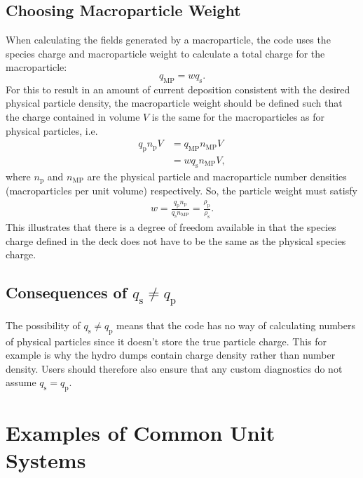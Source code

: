 \documentclass[twocolumn,10pt]{article}
\begin{document}
\subsection{Choosing Macroparticle Weight}
When calculating the fields generated by a macroparticle, the code uses the species charge and macroparticle weight to calculate a total charge for the macroparticle:
\begin{equation}
	q_{\mathrm{MP}} = wq_{\mathrm{s}}.
\end{equation}
For this to result in an amount of current deposition consistent with the desired physical particle density, the macroparticle weight should be defined such that the charge contained in volume $V$ is the same for the macroparticles as for physical particles, i.e.
\begin{align*}
	q_{\mathrm{p}}n_{\mathrm{p}}V &= q_{\mathrm{MP}}n_{\mathrm{MP}}V \\
		&= wq_{\mathrm{s}}n_{\mathrm{MP}}V,
\end{align*}
where $n_{\mathrm{p}}$ and $n_{\mathrm{MP}}$ are the physical particle and macroparticle number densities (macroparticles per unit volume) respectively. So, the particle weight must satisfy
\begin{align}
	w = \frac{q_{\mathrm{p}}n_{\mathrm{p}}}{q_{\mathrm{s}}n_{\mathrm{MP}}} = \frac{\rho_{\mathrm{p}}}{\rho_{\mathrm{s}}}.
\end{align}
This illustrates that there is a degree of freedom available in that the species charge defined in the deck does not have to be the same as the physical species charge.

\subsection{Consequences of $q_{\mathrm{s}} \neq q_{\mathrm{p}}$}

The possibility of $q_{\mathrm{s}} \neq q_{\mathrm{p}}$ means that the code has no way of calculating numbers of physical particles since it doesn't store the true particle charge.
This for example is why the hydro dumps contain charge density rather than number density.
Users should therefore also ensure that any custom diagnostics do not assume $q_{\mathrm{s}} = q_{\mathrm{p}}$.



\section{Examples of Common Unit Systems}
\end{document}
